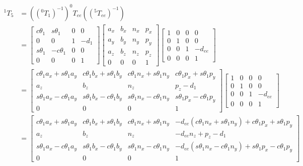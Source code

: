 \documentclass[utf8]{article}
\begin{document}
\begin{equation}\label{1T5_2}
\begin{aligned}
^1T_5 &= ((^0T_1)^{-1}) ^0T_{ee}((^5T_{ee})^{-1})\\
&= \left[
\begin{matrix}
c\theta_1 & s\theta_1 & 0 & 0\\
0 & 0 & 1 & -d_1\\
s\theta_1 & -c\theta_1 & 0 & 0\\
0 & 0 & 0 & 1
\end{matrix}
\right]\left[
\begin{matrix}
a_x & b_x & n_x & p_x\\
a_y & b_y & n_y & p_y\\
a_z & b_z & n_z & p_z\\
0 & 0 & 0 & 1
\end{matrix}
\right]\left[
\begin{matrix}
1 & 0 & 0 & 0\\
0 & 1 & 0 & 0\\
0 & 0 & 1 & -d_{ee}\\
0 & 0 & 0 & 1
\end{matrix}
\right]\\
&= \left[
\begin{matrix}
c\theta_1a_x+ s\theta_1a_y & c\theta_1b_x + s\theta_1b_y & c\theta_1n_x+ s\theta_1n_y & c\theta_1p_x+ s\theta_1 p_y\\
a_z & b_z & n_z & p_z - d_1\\
s\theta_1 a_x- c\theta_1a_y & s\theta_1b_x - c\theta_1b_y & s\theta_1n_x - c\theta_1 n_y & s\theta_1 p_x - c\theta_1 p_y\\
0 & 0 & 0 & 1
\end{matrix}
\right]\left[
\begin{matrix}
1 & 0 & 0 & 0\\
0 & 1 & 0 & 0\\
0 & 0 & 1 & -d_{ee}\\
0 & 0 & 0 & 1
\end{matrix}
\right]\\
&= \left[
\begin{matrix}
c\theta_1 a_x+ s\theta_1a_y & c\theta_1b_x+ s\theta_1b_y & c\theta_1n_x + s\theta_1n_y & -d_{ee}(c\theta_1n_x + s\theta_1n_y) + c\theta_1p_x + s\theta_1 p_y\\
a_z & b_z & n_z & -d_{ee}n_z + p_z - d_1\\
s\theta_1a_x - c\theta_1a_y & s\theta_1b_x - c\theta_1b_y & s\theta_1n_x-c\theta_1n_y & -d_{ee}(s\theta_1n_x - c\theta_1n_y) + s\theta_1p_x - c\theta_1p_y\\
0 & 0 & 0 & 1
\end{matrix}
\right]
\end{aligned}
\end{equation}
\end{document}
